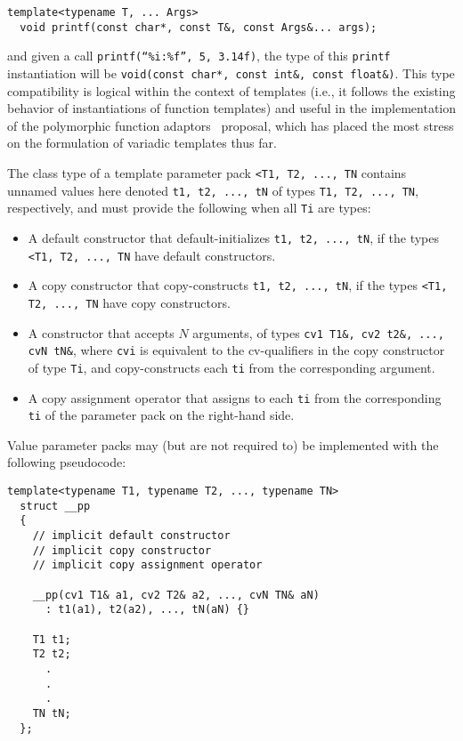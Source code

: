 \documentclass{article}
\begin{document}
\begin{verbatim}
template<typename T, ... Args>
  void printf(const char*, const T&, const Args&... args);
\end{verbatim}

and given a call {\tt printf(``\%i:\%f'', 5, 3.14f)}, the type of this
{\tt printf} instantiation will be {\tt void(const char*, const int\&,
  const float\&)}. This type compatibility is logical within the
context of templates (i.e., it follows the existing behavior of
instantiations of function templates) and useful in the
implementation of the polymorphic function adaptors~\cite{Gregor02}
proposal, which has placed the most stress on the formulation of
variadic templates thus far.

The class type of a template parameter pack \texttt{<T1, T2, ..., TN}
contains unnamed values here denoted \texttt{t1, t2, ..., tN} of types
\texttt{T1, T2, ..., TN}, respectively, and must provide the following
when all \texttt{Ti} are types:
\begin{itemize}
\item A default constructor that default-initializes \texttt{t1, t2,
    ..., tN}, if the types \texttt{<T1, T2, ..., TN} have default
  constructors.
\item A copy constructor that copy-constructs \texttt{t1, t2,
    ..., tN}, if the types \texttt{<T1, T2, ..., TN} have copy
  constructors.
\item A constructor that accepts $N$ arguments, of types \texttt{cv1
    T1\&, cv2 t2\&, ..., cvN tN\&}, where \texttt{cvi} is equivalent to
  the cv-qualifiers in the copy constructor of type \texttt{Ti}, and
  copy-constructs each \texttt{ti} from the corresponding argument.

\item A copy assignment operator that assigns to each \texttt{ti} from
  the corresponding \texttt{ti} of the parameter pack on the
  right-hand side.
\end{itemize}

Value parameter packs may (but are not required to) be implemented
with the following pseudocode:
\begin{verbatim}
template<typename T1, typename T2, ..., typename TN>
  struct __pp
  {
    // implicit default constructor
    // implicit copy constructor
    // implicit copy assignment operator
   
    __pp(cv1 T1& a1, cv2 T2& a2, ..., cvN TN& aN)
      : t1(a1), t2(a2), ..., tN(aN) {}

    T1 t1;
    T2 t2;
      .
      .
      .
    TN tN;
  };
\end{verbatim}
\end{document}

